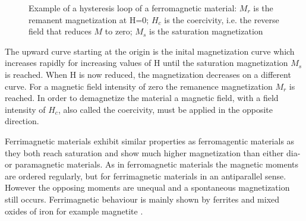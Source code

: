 \begin{figure}[h]
\centering

\caption[Hysteresis loop of a ferromagnetic material]{Example of a hysteresis loop of a ferromagnetic material: $M_{r}$ is the remanent magnetization at H=0; ${H}_{c}$ is the coercivity, i.e. the reverse field that reduces $M$ to zero; $M_{s}$ is the saturation magnetization
\label{fig:hyst_loop}
}
\end{figure}

The upward curve starting at the origin is the inital magnetization curve which increases rapidly for increasing values of H until the saturation magnetization $M_{s}$ is reached. When H is now reduced, the magnetization decreases on a different curve. For a magnetic field intensity of zero the remanence magnetization $M_{r}$ is reached. In order to demagnetize the material a magnetic field, with a field intensity of $H_{c}$, also called the coercivity, must be applied in the opposite direction\cite{svoboda2004magnetic,sung2003physics,aharoni2000introduction}. 

Ferrimagnetic materials exhibit similar properties as ferromagentic materials as they both reach saturation and show much higher magnetization than either dia- or paramagnetic materials. As in ferromagnetic materials the magnetic moments are ordered regularly, but for ferrimagnetic materials in an antiparallel sense. However the opposing moments are unequal and a spontaneous magnetization still occurs. Ferrimagnetic behaviour is mainly shown by ferrites and mixed oxides of iron for example magnetite \cite{svoboda2004magnetic,michalowsky2006magnettechnik}.

